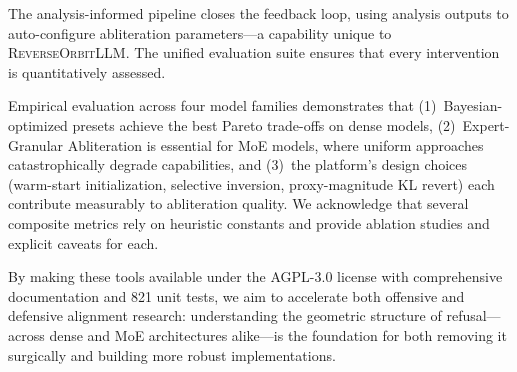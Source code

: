 \documentclass[11pt]{article}
\begin{document}
The analysis-informed pipeline closes the feedback loop, using analysis outputs to auto-configure abliteration parameters---a capability unique to \textsc{ReverseOrbitLLM}. The unified evaluation suite ensures that every intervention is quantitatively assessed.

Empirical evaluation across four model families demonstrates that (1)~Bayesian-optimized presets achieve the best Pareto trade-offs on dense models, (2)~Expert-Granular Abliteration is essential for MoE models, where uniform approaches catastrophically degrade capabilities, and (3)~the platform's design choices (warm-start initialization, selective inversion, proxy-magnitude KL revert) each contribute measurably to abliteration quality. We acknowledge that several composite metrics rely on heuristic constants and provide ablation studies and explicit caveats for each.

By making these tools available under the AGPL-3.0 license with comprehensive documentation and 821 unit tests, we aim to accelerate both offensive and defensive alignment research: understanding the geometric structure of refusal---across dense and MoE architectures alike---is the foundation for both removing it surgically and building more robust implementations.



\end{document}
